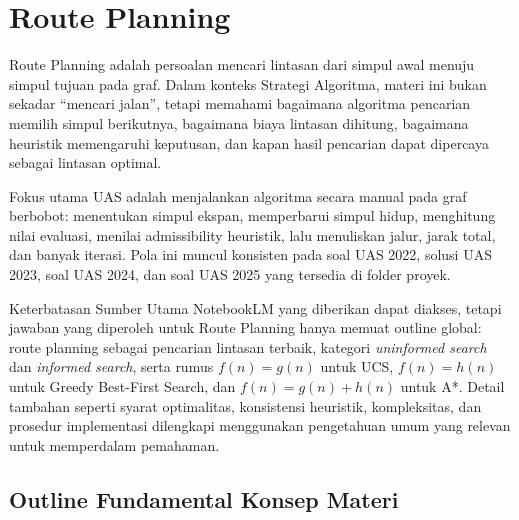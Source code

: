 \section{Route Planning}

Route Planning adalah persoalan mencari lintasan dari simpul awal menuju simpul tujuan pada graf. Dalam konteks Strategi Algoritma, materi ini bukan sekadar ``mencari jalan'', tetapi memahami bagaimana algoritma pencarian memilih simpul berikutnya, bagaimana biaya lintasan dihitung, bagaimana heuristik memengaruhi keputusan, dan kapan hasil pencarian dapat dipercaya sebagai lintasan optimal.

Fokus utama UAS adalah menjalankan algoritma secara manual pada graf berbobot: menentukan simpul ekspan, memperbarui simpul hidup, menghitung nilai evaluasi, menilai admissibility heuristik, lalu menuliskan jalur, jarak total, dan banyak iterasi. Pola ini muncul konsisten pada soal UAS 2022, solusi UAS 2023, soal UAS 2024, dan soal UAS 2025 yang tersedia di folder proyek.

\begin{cmt}{Keterbatasan Sumber Utama}{}
NotebookLM yang diberikan dapat diakses, tetapi jawaban yang diperoleh untuk Route Planning hanya memuat outline global: route planning sebagai pencarian lintasan terbaik, kategori \textit{uninformed search} dan \textit{informed search}, serta rumus $f(n)=g(n)$ untuk UCS, $f(n)=h(n)$ untuk Greedy Best-First Search, dan $f(n)=g(n)+h(n)$ untuk A*. Detail tambahan seperti syarat optimalitas, konsistensi heuristik, kompleksitas, dan prosedur implementasi dilengkapi menggunakan pengetahuan umum yang relevan untuk memperdalam pemahaman.
\end{cmt}

\subsection{Outline Fundamental Konsep Materi}

